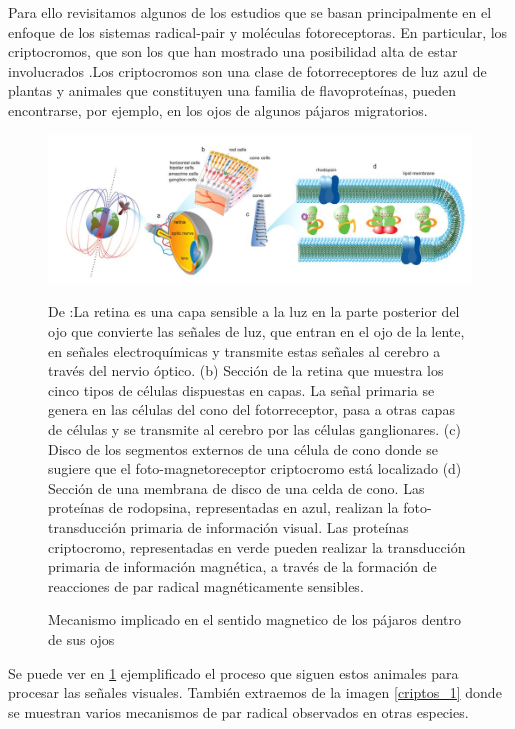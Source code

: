 \documentclass[1p]{elsarticle}
\begin{document}
Para ello revisitamos algunos de los estudios que se basan principalmente en el enfoque de los sistemas radical-pair y moléculas fotoreceptoras. En particular, los criptocromos, que son los que han mostrado una posibilidad alta de estar involucrados .Los criptocromos son una clase de fotorreceptores de luz azul de plantas y animales que constituyen una familia de flavoproteínas, pueden encontrarse, por ejemplo, en los ojos de algunos pájaros migratorios.

\begin{figure}

	\includegraphics[width=1\textwidth]{ojos}
	\caption{Mecanismo implicado en el sentido magnetico de los pájaros dentro de sus ojos }
	\medskip
	\footnotesize
	De \cite{procopio2016inhomogeneous}:La retina es una capa sensible a la luz en la parte posterior del ojo que convierte las señales de luz, que entran en el ojo de la lente, en señales electroquímicas y transmite estas señales al cerebro a través del nervio óptico. (b) Sección de la retina que muestra los cinco tipos de células dispuestas en capas. La señal primaria se genera en las células del cono del fotorreceptor, pasa a otras capas de células y se transmite al cerebro por las células ganglionares. (c) Disco de los segmentos externos de una célula de cono donde se sugiere que el foto-magnetoreceptor criptocromo está localizado (d) Sección de una membrana de disco de una celda de cono. Las proteínas de rodopsina, representadas en azul, realizan la foto-transducción primaria de información visual. Las proteínas criptocromo, representadas en verde pueden realizar la transducción primaria de información magnética, a través de la formación de reacciones de par radical magnéticamente sensibles.
	\label{pollos_1}
\end{figure}

Se puede ver en \ref{pollos_1} ejemplificado el proceso que siguen estos animales para procesar las señales visuales. También extraemos de \cite{cromogeneral} la imagen \ref{criptos_1} donde se muestran varios mecanismos de par radical observados en otras especies.
\end{document}
